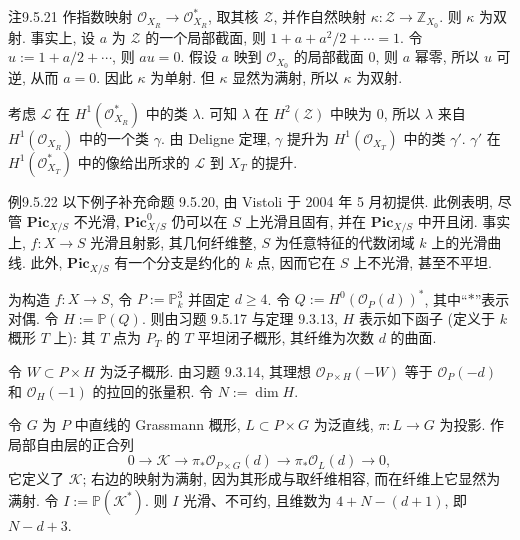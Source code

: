 \begin{origstatement}{注}{9.5.21}
作指数映射 $\mathcal O_{X_R}\to\mathcal O_{X_R}^*$, 取其核 $\mathcal Z$, 并作自然映射 $\kappa:\mathcal Z\to\mathbb Z_{X_0}$. 则 $\kappa$ 为双射. 事实上, 设 $a$ 为 $\mathcal Z$ 的一个局部截面, 则 $1+a+a^2/2+\cdots=1$. 令 $u:=1+a/2+\cdots$, 则 $au=0$. 假设 $a$ 映到 $\mathcal O_{X_0}$ 的局部截面 $0$, 则 $a$ 幂零, 所以 $u$ 可逆, 从而 $a=0$. 因此 $\kappa$ 为单射. 但 $\kappa$ 显然为满射, 所以 $\kappa$ 为双射.

考虑 $\mathcal L$ 在 $H^1(\mathcal O_{X_R}^*)$ 中的类 $\lambda$. 可知 $\lambda$ 在 $H^2(\mathcal Z)$ 中映为 $0$, 所以 $\lambda$ 来自 $H^1(\mathcal O_{X_R})$ 中的一个类 $\gamma$. 由 Deligne 定理, $\gamma$ 提升为 $H^1(\mathcal O_{X_T})$ 中的类 $\gamma'$. $\gamma'$ 在 $H^1(\mathcal O_{X_T}^*)$ 中的像给出所求的 $\mathcal L$ 到 $X_T$ 的提升.
\end{origstatement}
\begin{origstatement}{例}{9.5.22}\label{ch09s05:ex9.5.22}
以下例子补充命题 9.5.20, 由 Vistoli 于 2004 年 5 月初提供. 此例表明, 尽管 $\mathbf{Pic}_{X/S}$ 不光滑, $\mathbf{Pic}^0_{X/S}$ 仍可以在 $S$ 上光滑且固有, 并在 $\mathbf{Pic}_{X/S}$ 中开且闭. 事实上, $f:X\to S$ 光滑且射影, 其几何纤维整, $S$ 为任意特征的代数闭域 $k$ 上的光滑曲线. 此外, $\mathbf{Pic}_{X/S}$ 有一个分支是约化的 $k$ 点, 因而它在 $S$ 上不光滑, 甚至不平坦.

为构造 $f:X\to S$, 令 $P:=\mathbb P^3_k$ 并固定 $d\geq4$. 令 $Q:=H^0(\mathcal O_P(d))^*$, 其中“$*$”表示对偶. 令 $H:=\mathbb P(Q)$. 则由习题 9.5.17 与定理 9.3.13, $H$ 表示如下函子 (定义于 $k$ 概形 $T$ 上): 其 $T$ 点为 $P_T$ 的 $T$ 平坦闭子概形, 其纤维为次数 $d$ 的曲面.


令 $W\subset P\times H$ 为泛子概形. 由习题 9.3.14, 其理想 $\mathcal O_{P\times H}(-W)$ 等于 $\mathcal O_P(-d)$ 和 $\mathcal O_H(-1)$ 的拉回的张量积. 令 $N:=\dim H$.

令 $G$ 为 $P$ 中直线的 Grassmann 概形, $L\subset P\times G$ 为泛直线, $\pi:L\to G$ 为投影. 作局部自由层的正合列
\[
 0\longrightarrow\mathcal K\longrightarrow\pi_*\mathcal O_{P\times G}(d)
 \longrightarrow\pi_*\mathcal O_L(d)\longrightarrow0,
\]
它定义了 $\mathcal K$; 右边的映射为满射, 因为其形成与取纤维相容, 而在纤维上它显然为满射. 令 $I:=\mathbb P(\mathcal K^*)$. 则 $I$ 光滑、不可约, 且维数为 $4+N-(d+1)$, 即 $N-d+3$.


\end{origstatement}
